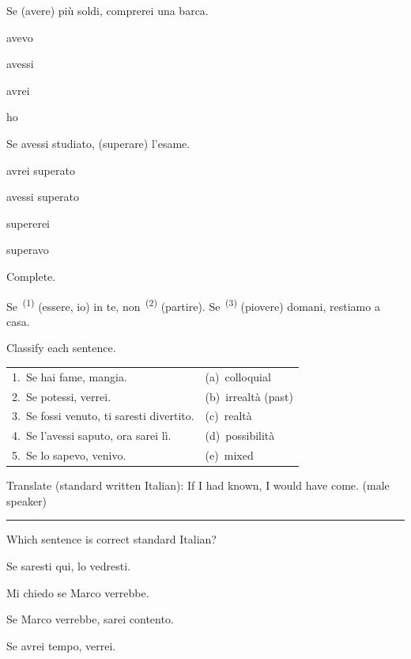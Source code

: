 \documentclass[11pt,a4paper,twoside,openright]{book}
\newcommand{\blank}{\underline{\hspace{2.6cm}}}
\newcommand{\clozeblank}[1]{\underline{\hspace{2.4cm}}\textsuperscript{\,(#1)}}
\newcommand{\answerline}{\par\vspace{6pt}\noindent\rule{0.75\linewidth}{0.4pt}\par}
\begin{document}
\begin{exercises}
\item\label{ex:periodo-ipotetico-1}\relax Se \blank{} (avere) più soldi, comprerei una barca.\par\nopagebreak\begin{options}
\item\relax avevo
\item\relax avessi
\item\relax avrei
\item\relax ho
\end{options}
\item\label{ex:periodo-ipotetico-2}\relax Se avessi studiato, \blank{} (superare) l'esame.\par\nopagebreak\begin{options}
\item\relax avrei superato
\item\relax avessi superato
\item\relax supererei
\item\relax superavo
\end{options}
\item\label{ex:periodo-ipotetico-3}\relax Complete.\par\smallskip\begingroup\setlength{\parindent}{0pt}Se \clozeblank{1} (essere, io) in te, non \clozeblank{2} (partire). Se \clozeblank{3} (piovere) domani, restiamo a casa.\par\endgroup
\item\label{ex:periodo-ipotetico-4}\relax Classify each sentence.\par\smallskip\begin{tabularx}{\linewidth}{@{}L L@{}}
1.\ Se hai fame, mangia. & (a)\ colloquial \\
2.\ Se potessi, verrei. & (b)\ irrealtà (past) \\
3.\ Se fossi venuto, ti saresti divertito. & (c)\ realtà \\
4.\ Se l'avessi saputo, ora sarei lì. & (d)\ possibilità \\
5.\ Se lo sapevo, venivo. & (e)\ mixed \\
\end{tabularx}
\item\label{ex:periodo-ipotetico-5}\relax Translate (standard written Italian): If I had known, I would have come. (male speaker)\par\answerline
\item\label{ex:periodo-ipotetico-6}\relax Which sentence is correct standard Italian?\par\nopagebreak\begin{options}
\item\relax Se saresti qui, lo vedresti.
\item\relax Mi chiedo se Marco verrebbe.
\item\relax Se Marco verrebbe, sarei contento.
\item\relax Se avrei tempo, verrei.
\end{options}
\end{exercises}
\end{document}
